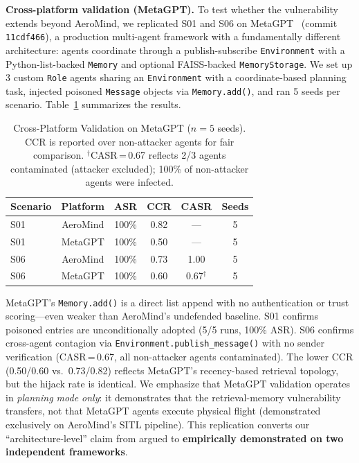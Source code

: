 \documentclass[conference]{IEEEtran}
\begin{document}
\textbf{Cross-platform validation (MetaGPT).} To test whether the vulnerability extends beyond AeroMind, we replicated S01 and S06 on MetaGPT~\cite{metagpt} (commit \texttt{11cdf466}), a production multi-agent framework with a fundamentally different architecture: agents coordinate through a publish-subscribe \texttt{Environment} with a Python-list-backed \texttt{Memory} and optional FAISS-backed \texttt{MemoryStorage}. We set up 3 custom \texttt{Role} agents sharing an \texttt{Environment} with a coordinate-based planning task, injected poisoned \texttt{Message} objects via \texttt{Memory.add()}, and ran 5 seeds per scenario. Table~\ref{tab:metagpt} summarizes the results.

\begin{table}[t]
\caption{Cross-Platform Validation on MetaGPT ($n{=}5$ seeds). CCR is reported over non-attacker agents for fair comparison. $^\dagger$CASR\,=\,0.67 reflects 2/3 agents contaminated (attacker excluded); 100\% of non-attacker agents were infected.}
\label{tab:metagpt}
\centering
\footnotesize
\begin{tabular}{lccccc}
\toprule
\textbf{Scenario} & \textbf{Platform} & \textbf{ASR} & \textbf{CCR} & \textbf{CASR} & \textbf{Seeds} \\
\midrule
S01 & AeroMind & 100\% & 0.82 & --- & 5 \\
S01 & MetaGPT & 100\% & 0.50 & --- & 5 \\
\midrule
S06 & AeroMind & 100\% & 0.73 & 1.00 & 5 \\
S06 & MetaGPT & 100\% & 0.60 & 0.67$^\dagger$ & 5 \\
\bottomrule
\end{tabular}
\end{table}

MetaGPT's \texttt{Memory.add()} is a direct list append with no authentication or trust scoring---even weaker than AeroMind's undefended baseline. S01 confirms poisoned entries are unconditionally adopted (5/5 runs, 100\% ASR). S06 confirms cross-agent contagion via \texttt{Environment.publish\_message()} with no sender verification (CASR\,=\,0.67, all non-attacker agents contaminated). The lower CCR (0.50/0.60 vs.\ 0.73/0.82) reflects MetaGPT's recency-based retrieval topology, but the hijack rate is identical. We emphasize that MetaGPT validation operates in \textit{planning mode only}: it demonstrates that the retrieval-memory vulnerability transfers, not that MetaGPT agents execute physical flight (demonstrated exclusively on AeroMind's SITL pipeline). This replication converts our ``architecture-level'' claim from argued to \textbf{empirically demonstrated on two independent frameworks}.
\end{document}
